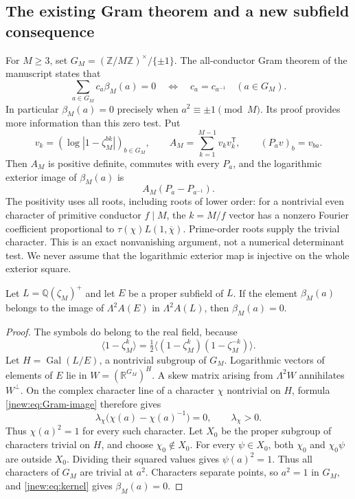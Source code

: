 \subsection{The existing Gram theorem and a new subfield consequence}

For $M\ge3$, set $G_M=(\mathbb Z/M\mathbb Z)^\times/\{\pm1\}$.
The all-conductor Gram theorem of the manuscript
\cite[\texttt{hstruct:thm:kernel}, \texttt{hstruct:lem:positive-Gram}]{ProveItSnapshot}
states that
\begin{equation}\label{jnew:eq:kernel}
 \sum_{a\in G_M}c_a\beta_M(a)=0
 \quad\Longleftrightarrow\quad c_a=c_{a^{-1}}\quad(a\in G_M).
\end{equation}
In particular $\beta_M(a)=0$ precisely when $a^2\equiv\pm1\pmod M$.
Its proof provides more information than this zero test. Put
\[
 v_k=(\log|1-\zeta_M^{bk}|)_{b\in G_M},\qquad
 A_M=\sum_{k=1}^{M-1}v_kv_k^{\mathsf T},\qquad
 (P_av)_b=v_{ba}.
\]
Then $A_M$ is positive definite, commutes with every $P_a$, and the
logarithmic exterior image of $\beta_M(a)$ is
\begin{equation}\label{jnew:eq:Gram-image}
 A_M(P_a-P_{a^{-1}}).
\end{equation}
The positivity uses all roots, including roots of lower order: for a
nontrivial even character of primitive conductor $f\mid M$, the
$k=M/f$ vector has a nonzero Fourier coefficient proportional to
$\tau(\chi)L(1,\overline\chi)$. Prime-order roots supply the trivial
character. This is an exact nonvanishing argument, not a numerical
determinant test. We never assume that the logarithmic exterior map
is injective on the whole exterior square.

\begin{theorem}
\label{jnew:thm:subfield}
Let $L=\mathbb Q(\zeta_M)^+$ and let $E$ be a proper subfield of $L$.
If the element $\beta_M(a)$ belongs to the image of
$\Lambda^2 A(E)$ in $\Lambda^2 A(L)$, then $\beta_M(a)=0$.
\end{theorem}
\begin{proof}
The symbols do belong to the real field, because
\[
 \langle1-\zeta_M^k\rangle
 =\tfrac12\langle(1-\zeta_M^k)(1-\zeta_M^{-k})\rangle.
\]
Let $H=\operatorname{Gal}(L/E)$, a nontrivial subgroup of $G_M$.
Logarithmic vectors of elements of $E$ lie in
$W=(\mathbb R^{G_M})^H$. A skew matrix arising from
$\Lambda^2 W$ annihilates $W^\perp$. On the complex character line
of a character $\chi$ nontrivial on $H$, formula
\eqref{jnew:eq:Gram-image} therefore gives
\[
 \lambda_\chi\bigl(\chi(a)-\chi(a)^{-1}\bigr)=0,
 \qquad\lambda_\chi>0.
\]
Thus $\chi(a)^2=1$ for every such character. Let $X_0$ be the
proper subgroup of characters trivial on $H$, and choose
$\chi_0\notin X_0$. For every $\psi\in X_0$, both $\chi_0$ and
$\chi_0\psi$ are outside $X_0$. Dividing their squared values gives
$\psi(a)^2=1$. Thus all characters of $G_M$ are trivial at $a^2$.
Characters separate points, so $a^2=1$ in $G_M$, and
\eqref{jnew:eq:kernel} gives $\beta_M(a)=0$.
\end{proof}


